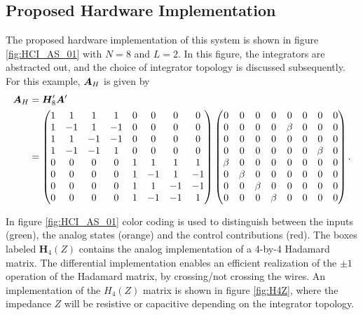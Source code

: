 \subsection{Proposed Hardware Implementation}
The proposed hardware implementation of this system is shown in figure \ref{fig:HCI_AS_01} with $N=8$ and $L=2$. In this figure, the integrators are abstracted out, and the choice of integrator topology is discussed subsequently. For this example, $\bm{A}_H$ is given by
\begin{align}
    \bm{A}_H & = \bm{H}'_8 \bm{A}' \\  & =
    \begin{pmatrix}
        1 & 1 & 1 & 1 & 0 & 0 & 0 & 0 \\
        1 & -1 & 1 & -1 & 0 & 0 & 0 & 0 \\
        1 & 1 & -1 & -1 & 0 & 0 & 0 & 0 \\
        1 & -1 & -1 & 1 & 0 & 0 & 0 & 0 \\
        0 & 0 & 0 & 0 & 1 & 1 & 1 & 1 \\
        0 & 0 & 0 & 0 & 1 & -1 & 1 & -1 \\
        0 & 0 & 0 & 0 & 1 & 1 & -1 & -1 \\
        0 & 0 & 0 & 0 & 1 & -1 & -1 & 1
    \end{pmatrix}
    \begin{pmatrix}
        0 & 0 & 0 & 0 & 0 & 0 & 0 & 0 \\
        0 & 0 & 0 & 0 & \beta & 0 & 0 & 0 \\
        0 & 0 & 0 & 0 & 0 & 0 & 0 & 0 \\
        0 & 0 & 0 & 0 & 0 & 0 & \beta & 0 \\
        \beta & 0 & 0 & 0 & 0 & 0 & 0 & 0 \\
        0 & \beta & 0 & 0 & 0 & 0 & 0 & 0 \\
        0 & 0 & \beta & 0 & 0 & 0 & 0 & 0 \\
        0 & 0 & 0 & \beta & 0 & 0 & 0 & 0
    \end{pmatrix}.
\end{align}

In figure \ref{fig:HCI_AS_01} color coding is used to distinguish between the inputs (green), the analog states (orange) and the control contributions (red). The boxes labeled $\bm{H}_4(Z)$ contains the analog implementation of a 4-by-4 Hadamard matrix. The differential implementation enables an efficient realization of the $\pm 1$ operation of the Hadamard matrix, by crossing/not crossing the wires. An implementation of the $H_4(Z)$ matrix is shown in figure \ref{fig:H4Z}, where the impedance $Z$ will be resistive or capacitive depending on the integrator topology.

